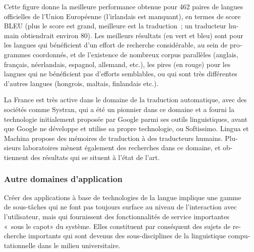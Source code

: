 \begin{french}
\begin{multicols}{2}

Cette figure donne la meilleure performance obtenue pour 462 paires de
langues officielles de l'Union Européenne (l'irlandais est manquant),
en termes de score BLEU (plus le score est grand, meilleure est la
traduction~; un traducteur humain obtiendrait environ 80). Les
meilleurs résultats (en vert et bleu) sont pour les langues qui
bénéficient d'un effort de recherche considérable, au sein de
programmes coordonnés, et de l'existence de nombreux corpus parallèles
(anglais, français, néerlandais, espagnol, allemand, etc.), les pires
(en rouge) pour les langues qui ne bénéficient pas d'efforts
semblables, ou qui sont très différentes d'autres langues (hongrois,
maltais, finlandais etc.).

La France est très active dans le domaine de la traduction
automatique, avec des sociétés comme Systran, qui a été un pionnier
dans ce domaine et a fourni la technologie initialement proposée par
Google parmi ses outils linguistiques, avant que Google ne développe
et utilise sa propre technologie, ou Softissimo. Lingua et Machina
propose des mémoires de traduction à des traducteurs
humains. Plusieurs laboratoires mènent également des recherches dans
ce domaine, et obtiennent des résultats qui se situent à l'état de
l'art.\\

\subsubsection{Autre domaines d'application}

Créer des applications à base de technologies de la langue implique
une gamme de sous-tâches qui ne font pas toujours surface au niveau de
l'interaction avec l'utilisateur, mais qui fournissent des
fonctionnalités de service importantes «~sous le capot» du
système. Elles constituent par conséquent des sujets de recherche
importants qui sont devenus des sous-disciplines de la linguistique
computationnelle dans le milieu universitaire.


\end{multicols}
\end{french}
